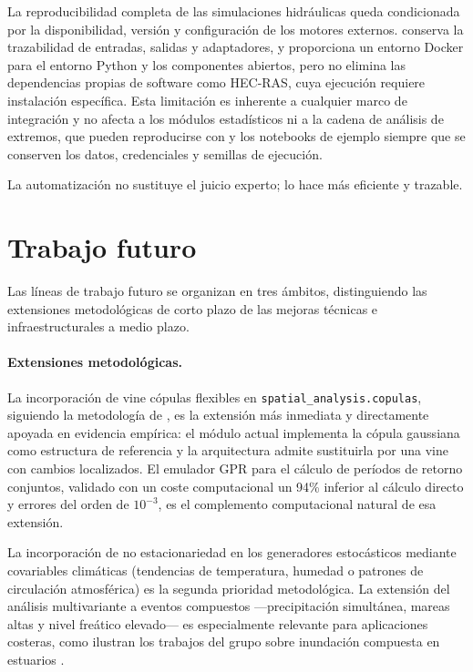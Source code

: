 La reproducibilidad completa de las simulaciones hidráulicas queda condicionada por la disponibilidad, versión y configuración de los motores externos. \hydra conserva la trazabilidad de entradas, salidas y adaptadores, y proporciona un entorno Docker para el entorno Python y los componentes abiertos, pero no elimina las dependencias propias de software como HEC-RAS, cuya ejecución requiere instalación específica. Esta limitación es inherente a cualquier marco de integración y no afecta a los módulos estadísticos ni a la cadena de análisis de extremos, que pueden reproducirse con \pyhydra y los notebooks de ejemplo siempre que se conserven los datos, credenciales y semillas de ejecución.

La automatización no sustituye el juicio experto; lo hace más eficiente y trazable.

\section{Trabajo futuro}

Las líneas de trabajo futuro se organizan en tres ámbitos, distinguiendo las extensiones metodológicas de corto plazo de las mejoras técnicas e infraestructurales a medio plazo.

\paragraph{Extensiones metodológicas.}
La incorporación de vine cópulas flexibles en \texttt{spatial\_analysis.copulas}, siguiendo la metodología de \textcite{urrea2026vine}, es la extensión más inmediata y directamente apoyada en evidencia empírica: el módulo actual implementa la cópula gaussiana como estructura de referencia y la arquitectura admite sustituirla por una vine con cambios localizados. El emulador GPR para el cálculo de períodos de retorno conjuntos, validado con un coste computacional un 94\% inferior al cálculo directo y errores del orden de $10^{-3}$, es el complemento computacional natural de esa extensión.

La incorporación de no estacionariedad en los generadores estocásticos mediante covariables climáticas (tendencias de temperatura, humedad o patrones de circulación atmosférica) es la segunda prioridad metodológica. La extensión del análisis multivariante a eventos compuestos \parencite{zscheischler2020compound} ---precipitación simultánea, mareas altas y nivel freático elevado--- es especialmente relevante para aplicaciones costeras, como ilustran los trabajos del grupo sobre inundación compuesta en estuarios \parencite{gomezrave2025compound}.

